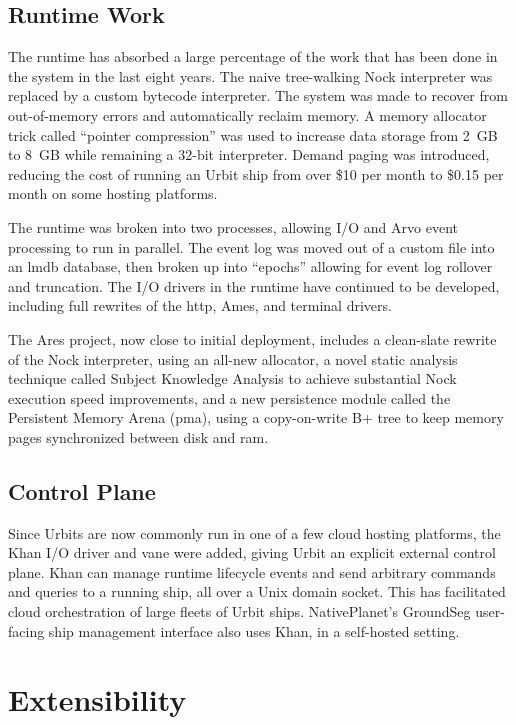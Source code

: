 \documentclass[twoside]{article}
\begin{document}
\subsection{Runtime Work}

The runtime has absorbed a large percentage of the work that has been done in the system in the last eight years.  The naive tree-walking Nock interpreter was replaced by a custom bytecode interpreter.  The system was made to recover from out-of-memory errors and automatically reclaim memory.  A memory allocator trick called ``pointer compression'' was used to increase data storage from 2~GB to 8~GB while remaining a 32-bit interpreter.  Demand paging was introduced, reducing the cost of running an Urbit ship from over \$10 per month to \$0.15 per month on some hosting platforms.

The runtime was broken into two processes, allowing I/O and Arvo event processing to run in parallel.  The event log was moved out of a custom file into an {\sc lmdb} database, then broken up into ``epochs'' allowing for event log rollover and truncation.  The I/O drivers in the runtime have continued to be developed, including full rewrites of the {\sc http}, Ames, and terminal drivers.  

The Ares project, now close to initial deployment, includes a clean-slate rewrite of the Nock interpreter, using an all-new allocator, a novel static analysis technique called Subject Knowledge Analysis to achieve substantial Nock execution speed improvements, and a new persistence module called the Persistent Memory Arena ({\sc pma}), using a copy-on-write B+ tree to keep memory pages synchronized between disk and {\sc ram}.

\subsection{Control Plane}

Since Urbits are now commonly run in one of a few cloud hosting platforms, the Khan I/O driver and vane were added, giving Urbit an explicit external control plane.  Khan can manage runtime lifecycle events and send arbitrary commands and queries to a running ship, all over a Unix domain socket.  This has facilitated cloud orchestration of large fleets of Urbit ships.  NativePlanet's GroundSeg user-facing ship management interface \citep{GroundSeg} also uses Khan, in a self-hosted setting.

\section{Extensibility}
\end{document}
